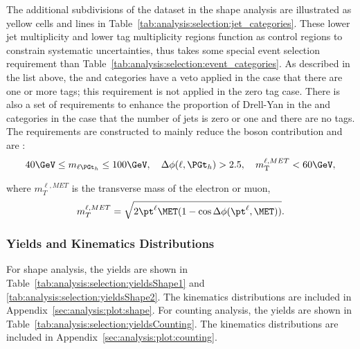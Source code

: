 

The additional subdivisions of the dataset in the shape analysis are illustrated as yellow cells and lines in Table~\ref{tab:analysis:selection:jet_categories}. These lower jet multiplicity and lower \PQb tag multiplicity regions function as control regions to constrain systematic uncertainties, thus takes some special event selection requirement than Table~\ref{tab:analysis:selection:event_categories}. As described in the list above, the \cee and \cmm categories have a \PZ veto applied in the case that there are one or more \PQb tags; this requirement is not applied in the zero \PQb tag case.  There is also a set of requirements to enhance the proportion of Drell-Yan in the \cet and \cmt categories in the case that the number of jets is zero or one and there are no \PQb tags.  The requirements are constructed to mainly reduce the \PW boson contribution and are :
\begin{equation*}
    40 \GeV \leq m_{\ell\PGt_{h}} \leq 100 \GeV, \quad \Delta\phi(\ell, \PGt_{h}) > 2.5, \quad m_{\rm T}^{\ell, MET} < 60 \GeV,
\end{equation*}

\noindent where $m_{T}^{\ell, MET} $ is the transverse mass of the electron or muon,
\begin{equation}
\label{eq:trans_mass}
    m_{T}^{\ell, MET} = \sqrt{2 \pt^{\ell}\MET (1-\cos\Delta\phi(\pt^{\ell}, \MET))}.
\end{equation}


\subsubsection{Yields and Kinematics Distributions}
For shape analysis, the yields are shown in Table~\ref{tab:analysis:selection:yieldsShape1} and \ref{tab:analysis:selection:yieldsShape2}. The kinematics distributions are included in Appendix~\ref{sec:analysis:plot:shape}. For counting analysis, the yields are shown in Table~\ref{tab:analysis:selection:yieldsCounting}. The kinematics distributions are included in Appendix~\ref{sec:analysis:plot:counting}.




